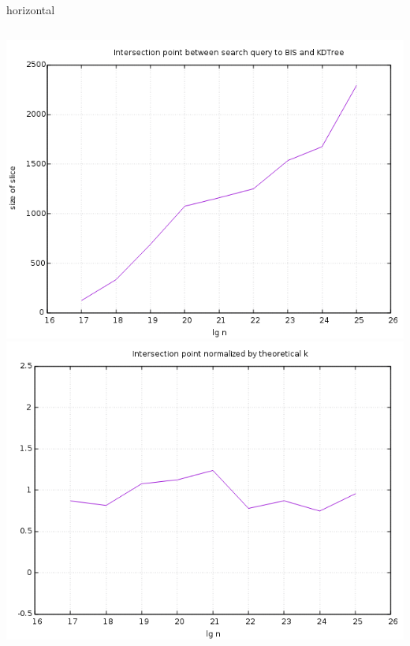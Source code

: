 \documentclass[pdf]{beamer}
\begin{document}
\begin{frame}{horizontal}
  \begin{columns}
    \includegraphics[scale=0.3]{pictures/analysis/hori.png}
    \includegraphics[scale=0.3]{pictures/analysis/hori_theory.png}
  \end{columns}
\end{frame}
\end{document}
